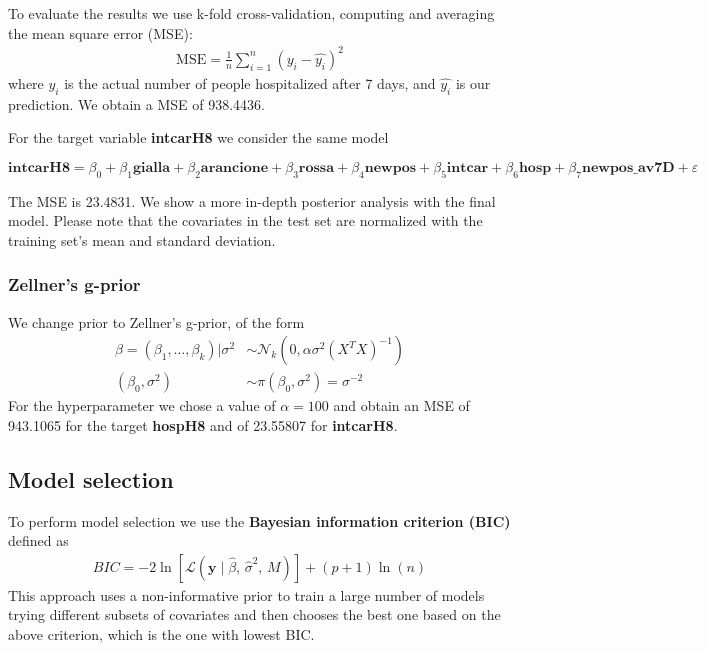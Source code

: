 \documentclass[12pt,a4paper]{article}
\theoremstyle{definition}
\theoremstyle{remark}
\begin{document}
To evaluate the results we use k-fold cross-validation, computing and averaging the mean square error (MSE):
\begin{align*}
	\text{MSE} = \frac{1}{n}\sum_{i=1}^{n}(y_i-\hat{y_i})^2
\end{align*}
where $y_i$ is the actual number of people hospitalized after 7 days, and $\hat{y_i}$ is our prediction. We obtain a MSE of 938.4436.

For the target variable \textbf{intcarH8} we consider the same model

\begin{dmath*}
	\textbf{intcarH8} = \beta_0 + \beta_1\textbf{gialla} + \beta_2\textbf{arancione} + \beta_3\textbf{rossa} + \beta_4\textbf{newpos} + \beta_5\textbf{intcar} + \beta_6\textbf{hosp} + \beta_7\textbf{newpos\_av7D} + \varepsilon
\end{dmath*}

The MSE is 23.4831. We show a more in-depth posterior analysis with the final model. Please note that the covariates in the test set are normalized with the training set's mean and standard deviation. 

\subsubsection*{Zellner's g-prior}

We change prior to Zellner's g-prior, of the form
    \begin{align*}
    \beta = (\beta_1,\dots, \beta_k)|\sigma^2 &\sim \mathcal{N}_k(0, \alpha\sigma^2(X^TX)^{-1}) \\
    (\beta_0, \sigma^2) &\sim \pi(\beta_0, \sigma^2) = \sigma^{-2}
    \end{align*}
For the hyperparameter we chose a value of $\alpha = 100$ and obtain an MSE of 943.1065 for the target \textbf{hospH8} and of 23.55807 for \textbf{intcarH8}.

\subsection{Model selection}
To perform model selection we use the \textbf{Bayesian information criterion (BIC)} defined as
    \begin{align*}
    BIC = -2\ln\left[\mathcal{L}\left(\mathbf{y} \mid \hat{\beta},\, \hat{\sigma}^2,\, M\right)\right]+(p+1)\ln(n)
    \end{align*}
This approach uses a non-informative prior to train a large number of models trying different subsets of covariates and then chooses the best one based on the above criterion, which is the one with lowest BIC.\\
\end{document}
